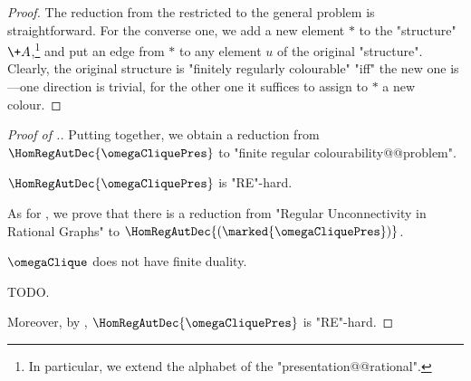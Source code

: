 \begin{proof}
	The reduction from the restricted to the general problem is straightforward.
	For the converse one, we add a new element $*$ to the "structure" $\+A$,\footnote{In particular, we extend the alphabet of the "presentation@@rational".} and put an edge
	from $*$ to any element $u$ of the original "structure". 
	Clearly, the original structure is "finitely regularly colourable" "iff" the new one is---one direction is trivial, for the other one it suffices to assign to $*$ a new colour.
\end{proof}

\begin{proof}[Proof of .]
	Putting  together, we obtain a reduction from
	$\HomRegAutDec{\omegaCliquePres}$ to "finite regular colourability@@problem".
	
	\begin{claim}
		$\HomRegAutDec{\omegaCliquePres}$ is "RE"-hard.
	\end{claim}
	As for , we prove that
	there is a reduction from "Regular Unconnectivity in Rational Graphs"
	to $\HomRegAutDec{(\marked{\omegaCliquePres})}$.

	\begin{claim}
		$\omegaClique$ does not have finite duality.
	\end{claim}
	TODO.
	
	Moreover, by ,
	$\HomRegAutDec{\omegaCliquePres}$ is "RE"-hard.
\end{proof}